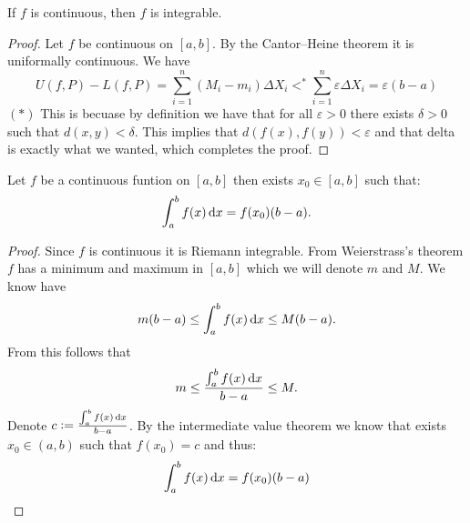 \documentclass[11pt,a4paper]{article}
\begin{document}
  \begin{definition}
    If $f$ is continuous, then $f$ is integrable.
  \end{definition}
  \begin{proof}
    Let $f$ be continuous on $[a,b]$.
    By the Cantor--Heine theorem it is uniformally continuous.
    We have
    \[
      U(f,P) - L(f,P) =
      \sum_{i=1}^{n}(M_i-m_i)\Delta X_i <^{*}
      \sum_{i=1}^n\varepsilon\Delta X_i = \varepsilon(b-a)
    \]
    $(*)$ This is becuase by definition we have that for all $\varepsilon > 0$
    there exists $\delta > 0$ such that $d(x,y) < \delta$. 
    This implies that $d(f(x),f(y)) < \varepsilon$
    and that delta is exactly what we wanted, which completes the proof.
  \end{proof}

  \begin{proposition}
    Let $f$ be a continuous funtion on $[a,b]$ then exists $x_0 \in [a,b]$
    such that: 
    \[
      \int_a^b f(x)\dx = f(x_0)(b - a).
    \]
  \end{proposition}
  \begin{proof}
    Since $f$ is continuous it is Riemann integrable. 
    From Weierstrass's theorem $f$ has a minimum and maximum in $[a,b]$ 
    which we will denote $m$ and $M$.
    We know have
    \[
      m (b - a) \le \int_a^b f(x)\dx \le M (b - a).
    \]
    From this follows that
    \[
      m \le \frac{\int_{a}^{b} f(x)\dx}{b - a} \le M.
    \]
    Denote $c := \frac{\int_{a}^{b} f(x)\dx}{b - a}$.
    By the intermediate value theorem we know that exists $x_0 \in (a,b)$
    such that $f(x_0) = c$ and thus:
    \[
      \int_{a}^{b} f(x)\dx = f(x_0)(b - a)
    \]
  \end{proof}

  \newpage
\end{document}
